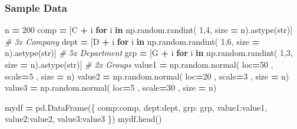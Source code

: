 \documentclass[
]{book}
\newenvironment{Shaded}{\begin{snugshade}}{\end{snugshade}}
\newcommand{\BuiltInTok}[1]{#1}
\newcommand{\CommentTok}[1]{\textcolor[rgb]{0.37,0.37,0.37}{\textit{#1}}}
\newcommand{\ControlFlowTok}[1]{\textcolor[rgb]{0.27,0.27,0.27}{\textbf{#1}}}
\newcommand{\DecValTok}[1]{\textcolor[rgb]{0.06,0.06,0.06}{#1}}
\newcommand{\KeywordTok}[1]{\textcolor[rgb]{0.27,0.27,0.27}{\textbf{#1}}}
\newcommand{\NormalTok}[1]{#1}
\newcommand{\OperatorTok}[1]{\textcolor[rgb]{0.43,0.43,0.43}{\textbf{#1}}}
\newcommand{\StringTok}[1]{\textcolor[rgb]{0.5,0.5,0.5}{#1}}
\begin{document}
\hypertarget{sample-data-2}{%
\subsubsection{Sample Data}\label{sample-data-2}}

\begin{Shaded}
\begin{Highlighting}[]
\NormalTok{n }\OperatorTok{=} \DecValTok{200}
\NormalTok{comp }\OperatorTok{=}\NormalTok{ [}\StringTok{\textquotesingle{}C\textquotesingle{}} \OperatorTok{+}\NormalTok{ i }\ControlFlowTok{for}\NormalTok{ i }\KeywordTok{in}\NormalTok{ np.random.randint( }\DecValTok{1}\NormalTok{,}\DecValTok{4}\NormalTok{, size  }\OperatorTok{=}\NormalTok{ n).astype(}\BuiltInTok{str}\NormalTok{)] }\CommentTok{\# 3x Company}
\NormalTok{dept }\OperatorTok{=}\NormalTok{ [}\StringTok{\textquotesingle{}D\textquotesingle{}} \OperatorTok{+}\NormalTok{ i }\ControlFlowTok{for}\NormalTok{ i }\KeywordTok{in}\NormalTok{ np.random.randint( }\DecValTok{1}\NormalTok{,}\DecValTok{6}\NormalTok{, size  }\OperatorTok{=}\NormalTok{ n).astype(}\BuiltInTok{str}\NormalTok{)] }\CommentTok{\# 5x Department}
\NormalTok{grp }\OperatorTok{=}\NormalTok{  [}\StringTok{\textquotesingle{}G\textquotesingle{}} \OperatorTok{+}\NormalTok{ i }\ControlFlowTok{for}\NormalTok{ i }\KeywordTok{in}\NormalTok{ np.random.randint( }\DecValTok{1}\NormalTok{,}\DecValTok{3}\NormalTok{, size  }\OperatorTok{=}\NormalTok{ n).astype(}\BuiltInTok{str}\NormalTok{)] }\CommentTok{\# 2x Groups}
\NormalTok{value1 }\OperatorTok{=}\NormalTok{ np.random.normal( loc}\OperatorTok{=}\DecValTok{50}\NormalTok{ , scale}\OperatorTok{=}\DecValTok{5}\NormalTok{ , size }\OperatorTok{=}\NormalTok{ n)}
\NormalTok{value2 }\OperatorTok{=}\NormalTok{ np.random.normal( loc}\OperatorTok{=}\DecValTok{20}\NormalTok{ , scale}\OperatorTok{=}\DecValTok{3}\NormalTok{ , size }\OperatorTok{=}\NormalTok{ n)}
\NormalTok{value3 }\OperatorTok{=}\NormalTok{ np.random.normal( loc}\OperatorTok{=}\DecValTok{5}\NormalTok{ , scale}\OperatorTok{=}\DecValTok{30}\NormalTok{ , size }\OperatorTok{=}\NormalTok{ n)}

\NormalTok{mydf }\OperatorTok{=}\NormalTok{ pd.DataFrame(\{}
    \StringTok{\textquotesingle{}comp\textquotesingle{}}\NormalTok{:comp, }
    \StringTok{\textquotesingle{}dept\textquotesingle{}}\NormalTok{:dept, }
    \StringTok{\textquotesingle{}grp\textquotesingle{}}\NormalTok{: grp,}
    \StringTok{\textquotesingle{}value1\textquotesingle{}}\NormalTok{:value1, }
    \StringTok{\textquotesingle{}value2\textquotesingle{}}\NormalTok{:value2,}
    \StringTok{\textquotesingle{}value3\textquotesingle{}}\NormalTok{:value3 \})}
\NormalTok{mydf.head()}
\end{Highlighting}
\end{Shaded}
\end{document}
